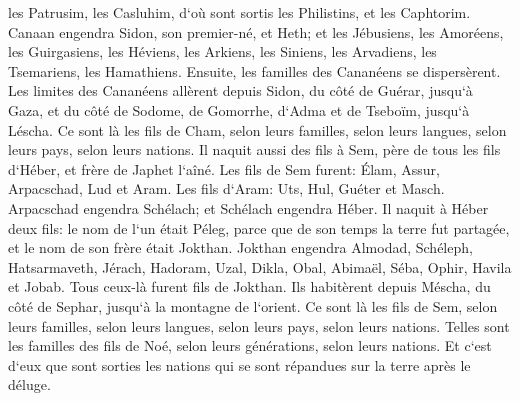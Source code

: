 \verse les Patrusim, les Casluhim, d`où sont sortis les Philistins, et les Caphtorim. 
\verse Canaan engendra Sidon, son premier-né, et Heth; 
\verse et les Jébusiens, les Amoréens, les Guirgasiens, 
\verse les Héviens, les Arkiens, les Siniens, 
\verse les Arvadiens, les Tsemariens, les Hamathiens. Ensuite, les familles des Cananéens se dispersèrent. 
\verse Les limites des Cananéens allèrent depuis Sidon, du côté de Guérar, jusqu`à Gaza, et du côté de Sodome, de Gomorrhe, d`Adma et de Tseboïm, jusqu`à Léscha. 
\verse Ce sont là les fils de Cham, selon leurs familles, selon leurs langues, selon leurs pays, selon leurs nations. 
\verse Il naquit aussi des fils à Sem, père de tous les fils d`Héber, et frère de Japhet l`aîné. 
\verse Les fils de Sem furent: Élam, Assur, Arpacschad, Lud et Aram. 
\verse Les fils d`Aram: Uts, Hul, Guéter et Masch. 
\verse Arpacschad engendra Schélach; et Schélach engendra Héber. 
\verse Il naquit à Héber deux fils: le nom de l`un était Péleg, parce que de son temps la terre fut partagée, et le nom de son frère était Jokthan. 
\verse Jokthan engendra Almodad, Schéleph, Hatsarmaveth, Jérach, 
\verse Hadoram, Uzal, Dikla, 
\verse Obal, Abimaël, Séba, 
\verse Ophir, Havila et Jobab. Tous ceux-là furent fils de Jokthan. 
\verse Ils habitèrent depuis Méscha, du côté de Sephar, jusqu`à la montagne de l`orient. 
\verse Ce sont là les fils de Sem, selon leurs familles, selon leurs langues, selon leurs pays, selon leurs nations. 
\verse Telles sont les familles des fils de Noé, selon leurs générations, selon leurs nations. Et c`est d`eux que sont sorties les nations qui se sont répandues sur la terre après le déluge. 

